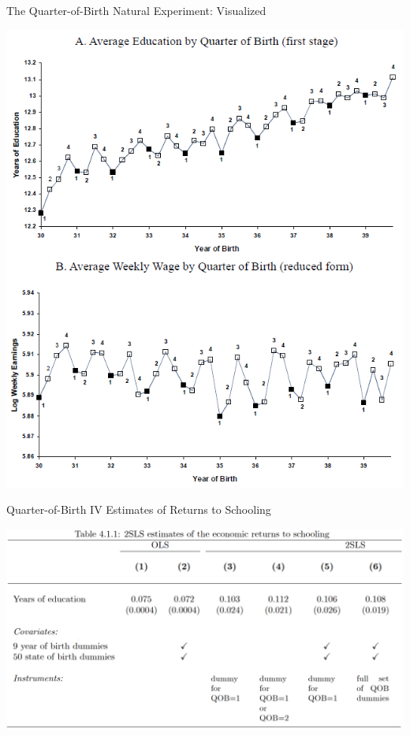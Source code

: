 \documentclass{beamer}
\begin{document}
\begin{frame}{The Quarter-of-Birth Natural Experiment: Visualized}

\vspace{-0.3cm}
\begin{center}
\includegraphics[scale=0.45]{./lecture_includes/qob1.png}
\end{center}

\end{frame}

\begin{frame}{Quarter-of-Birth IV Estimates of Returns to Schooling}

\begin{center}
\includegraphics[scale=0.32]{./lecture_includes/qob2.png}
\end{center}

\end{frame}
\end{document}
